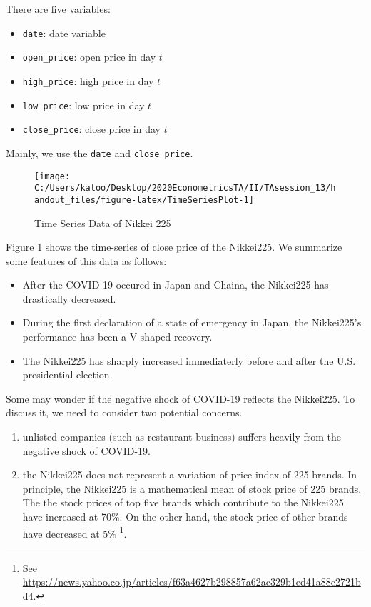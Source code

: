 \documentclass[
  12pt,
]{article}
\providecommand{\tightlist}{%
  \setlength{\itemsep}{0pt}\setlength{\parskip}{0pt}}
\begin{document}
There are five variables:

\begin{itemize}
\tightlist
\item
  \texttt{date}: date variable
\item
  \texttt{open\_price}: open price in day \(t\)
\item
  \texttt{high\_price}: high price in day \(t\)
\item
  \texttt{low\_price}: low price in day \(t\)
\item
  \texttt{close\_price}: close price in day \(t\)
\end{itemize}

Mainly, we use the \texttt{date} and \texttt{close\_price}.

\begin{figure}[h]

{\centering \texttt{[image: C:/Users/katoo/Desktop/2020EconometricsTA/II/TAsession\_13/handout\_files/figure-latex/TimeSeriesPlot-1]} 

}

\caption{Time Series Data of Nikkei 225}\label{fig:TimeSeriesPlot}
\end{figure}

Figure 1 shows the time-series of close price of the Nikkei225. We
summarize some features of this data as follows:

\begin{itemize}
\tightlist
\item
  After the COVID-19 occured in Japan and Chaina, the Nikkei225 has
  drastically decreased.
\item
  During the first declaration of a state of emergency in Japan, the
  Nikkei225's performance has been a V-shaped recovery.
\item
  The Nikkei225 has sharply increased immediaterly before and after the
  U.S. presidential election.
\end{itemize}

Some may wonder if the negative shock of COVID-19 reflects the
Nikkei225. To discuss it, we need to consider two potential concerns.

\begin{enumerate}
\def\labelenumi{\arabic{enumi}.}
\tightlist
\item
  unlisted companies (such as restaurant business) suffers heavily from
  the negative shock of COVID-19.
\item
  the Nikkei225 does not represent a variation of price index of 225
  brands. In principle, the Nikkei225 is a mathematical mean of stock
  price of 225 brands. The the stock prices of top five brands which
  contribute to the Nikkei225 have increased at 70\%. On the other hand,
  the stock price of other brands have decreased at 5\% \footnote{See
    \url{https://news.yahoo.co.jp/articles/f63a4627b298857a62ac329b1ed41a88c2721bd4}.}.
\end{enumerate}
\end{document}
